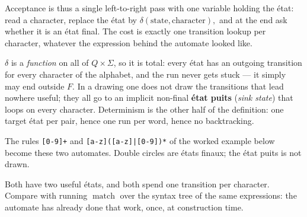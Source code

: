 Acceptance is thus a single left-to-right pass with one variable holding the
état: read a character, replace the état by
$\delta(\text{state}, \text{character}), $ and at the end ask whether it is an
état final. The cost is exactly one transition lookup per character, whatever
the expression behind the automate looked like.

\begin{remark}
  $\delta$ is a \emph{function} on all of $Q \times \Sigma$, so it is total:
  every état has an outgoing transition for every character of the alphabet,
  and the run never gets stuck --- it simply may end outside $F$. In a drawing
  one does not draw the transitions that lead nowhere useful; they all go to an
  implicit non-final \textbf{état puits} (\textit{sink state}) that loops on
  every character. Determinism is the other half of the definition: one target
  état per pair, hence one run per word, hence no backtracking.
\end{remark}

\begin{example}
  The rules \texttt{[0-9]+} and \texttt{[a-z]([a-z]|[0-9])*} of the worked
  example below become these two automates. Double circles are états finaux;
  the état puits is not drawn.
  \begin{figure}[h!]
    \centering
  \end{figure}
  Both have two useful états, and both spend one transition per character.
  Compare with running $\operatorname{match}$ over the syntax tree of the same
  expressions: the automate has already done that work, once, at construction
  time.
\end{example}

